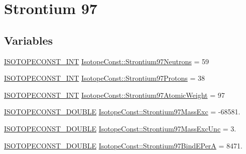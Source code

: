 \hypertarget{group___isotope_const-_strontium-_sr97}{}\section{Strontium 97}
\label{group___isotope_const-_strontium-_sr97}
\subsection*{Variables}
\begin{DoxyCompactItemize}
\item 
\mbox{\hyperlink{group___isotope_const-_macros_ga5f18360b3e99483a35c32d789e62621c}{I\+S\+O\+T\+O\+P\+E\+C\+O\+N\+S\+T\+\_\+\+I\+NT}} \mbox{\hyperlink{group___isotope_const-_strontium-_sr97_ga2f7146f77e20d0fc204d35d44ddc7de0}{Isotope\+Const\+::\+Strontium97\+Neutrons}} = 59
\item 
\mbox{\hyperlink{group___isotope_const-_macros_ga5f18360b3e99483a35c32d789e62621c}{I\+S\+O\+T\+O\+P\+E\+C\+O\+N\+S\+T\+\_\+\+I\+NT}} \mbox{\hyperlink{group___isotope_const-_strontium-_sr97_ga33401b48d93cbf0929560607f2c90413}{Isotope\+Const\+::\+Strontium97\+Protons}} = 38
\item 
\mbox{\hyperlink{group___isotope_const-_macros_ga5f18360b3e99483a35c32d789e62621c}{I\+S\+O\+T\+O\+P\+E\+C\+O\+N\+S\+T\+\_\+\+I\+NT}} \mbox{\hyperlink{group___isotope_const-_strontium-_sr97_ga74a564f3a6d92e5e101128d3c03ec546}{Isotope\+Const\+::\+Strontium97\+Atomic\+Weight}} = 97
\item 
\mbox{\hyperlink{group___isotope_const-_macros_ga8f45a7272ce02c0b4c65c44636ed719a}{I\+S\+O\+T\+O\+P\+E\+C\+O\+N\+S\+T\+\_\+\+D\+O\+U\+B\+LE}} \mbox{\hyperlink{group___isotope_const-_strontium-_sr97_ga83d19120e64ca9598be94c183ffeb3ba}{Isotope\+Const\+::\+Strontium97\+Mass\+Exc}} = -\/68581.
\item 
\mbox{\hyperlink{group___isotope_const-_macros_ga8f45a7272ce02c0b4c65c44636ed719a}{I\+S\+O\+T\+O\+P\+E\+C\+O\+N\+S\+T\+\_\+\+D\+O\+U\+B\+LE}} \mbox{\hyperlink{group___isotope_const-_strontium-_sr97_gad4954e8b0e78c3f9f48ff15b0be48e70}{Isotope\+Const\+::\+Strontium97\+Mass\+Exc\+Unc}} = 3.
\item 
\mbox{\hyperlink{group___isotope_const-_macros_ga8f45a7272ce02c0b4c65c44636ed719a}{I\+S\+O\+T\+O\+P\+E\+C\+O\+N\+S\+T\+\_\+\+D\+O\+U\+B\+LE}} \mbox{\hyperlink{group___isotope_const-_strontium-_sr97_ga57bb7f93da6423e140584e0147b01625}{Isotope\+Const\+::\+Strontium97\+Bind\+E\+PerA}} = 8471.
\item 

\end{DoxyCompactItemize}
